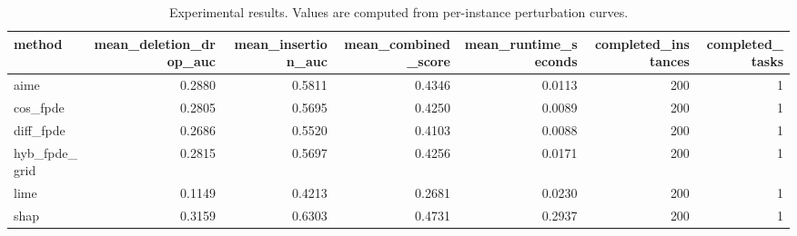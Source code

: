 \begin{table}[t]
\caption{Experimental results. Values are computed from per-instance perturbation curves.}
\label{tab:main_results_computed}
\centering
\begin{tabular}{lrrrrrr}
\toprule
method & mean\_deletion\_drop\_auc & mean\_insertion\_auc & mean\_combined\_score & mean\_runtime\_seconds & completed\_instances & completed\_tasks \\
\midrule
aime & 0.2880 & 0.5811 & 0.4346 & 0.0113 & 200 & 1 \\
cos\_fpde & 0.2805 & 0.5695 & 0.4250 & 0.0089 & 200 & 1 \\
diff\_fpde & 0.2686 & 0.5520 & 0.4103 & 0.0088 & 200 & 1 \\
hyb\_fpde\_grid & 0.2815 & 0.5697 & 0.4256 & 0.0171 & 200 & 1 \\
lime & 0.1149 & 0.4213 & 0.2681 & 0.0230 & 200 & 1 \\
shap & 0.3159 & 0.6303 & 0.4731 & 0.2937 & 200 & 1 \\
\bottomrule
\end{tabular}

\end{table}
